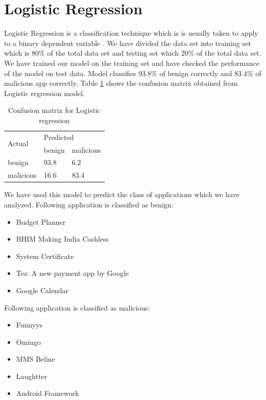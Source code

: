 \section{Logistic Regression}
Logistic Regression is a classification technique which is is usually taken to apply to a binary dependent variable \cite{wiki:xxx2}. We have divided the data set into training set which is 80\% of the total data set and testing set which 20\% of the total data set. We have trained our model on the training set and have checked the performance of the model on test data. Model classifies 93.8\% of benign correctly and 83.4\% of malicious app correctly. Table \ref{table:tab2} shows the confusion matrix obtained from Logistic regression model. 
\begin{table}[!h]
\centering

\begin{tabular}{|l||l|l|}
\hline
\multirow{2}{4em}{Actual} & \multicolumn{2}{l|}{Predicted} \\ \cline{2-3} 
                  &    benign      &    malicious       \\ \hline
         benign         &      93.8     &    6.2       \\ \hline
        malicious          &     16.6      &      83.4     \\ \hline
\end{tabular}%
\caption{Confusion matrix for Logistic regression}
\label{table:tab2}
\end{table}
We have used this model to predict the class of applications which we have analyzed. Following application is classified as benign:
\begin{itemize}
    \item Budget Planner
    \item BHIM Making India Cashless
    \item System Certificate
    \item Tez: A new payment app by Google
    \item Google Calendar
\end{itemize}
Following application is classified as malicious:
\begin{itemize}
    \item Funnyys
    \item Omingo
    \item MMS Beline
    \item Laughtter
    \item Android Framework
\end{itemize}

